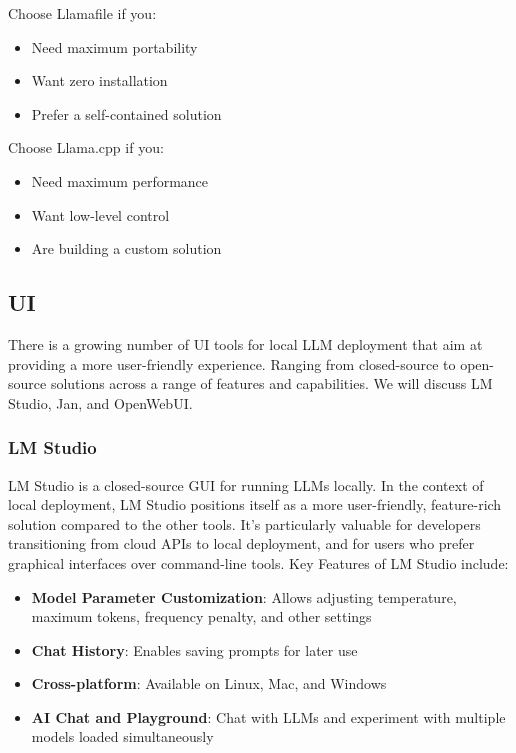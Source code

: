 Choose Llamafile if you:
\begin{itemize}
\item Need maximum portability
\item Want zero installation
\item Prefer a self-contained solution
\end{itemize}

Choose Llama.cpp if you:
\begin{itemize}
\item Need maximum performance
\item Want low-level control
\item Are building a custom solution
\end{itemize}

\subsection{UI}

There is a growing number of UI tools for local LLM deployment that aim at providing a more user-friendly experience. Ranging from closed-source to open-source solutions across a range of features and capabilities. We will discuss LM Studio, Jan, and OpenWebUI.

\subsubsection{LM Studio}

LM Studio  is a closed-source GUI for running LLMs locally. In the context of local deployment, LM Studio positions itself as a more user-friendly, feature-rich solution compared to the other tools. It's particularly valuable for developers transitioning from cloud APIs to local deployment, and for users who prefer graphical interfaces over command-line tools. Key Features of LM Studio include:

\begin{itemize}
\item \textbf{Model Parameter Customization}: Allows adjusting temperature, maximum tokens, frequency penalty, and other settings
\item \textbf{Chat History}: Enables saving prompts for later use
\item \textbf{Cross-platform}: Available on Linux, Mac, and Windows
\item \textbf{AI Chat and Playground}: Chat with LLMs and experiment with multiple models loaded simultaneously
\end{itemize}

